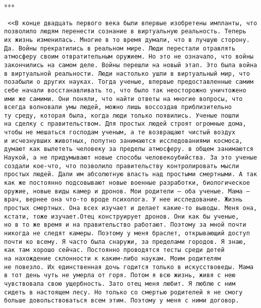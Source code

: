  \begin{center}
 	***
 \end{center}
{\tt
\setlength{\leftskip}{1em}
\setlength{\rightskip}{6em}
<<В~конце двадцать первого века были впервые изобретены импланты, что позволило людям перенести сознание в~виртуальную реальность.
Теперь их~жизнь изменилась.
Многие в~то~время думали, что в~лучшую сторону.
Да.
Войны прекратились в~реальном мире.
Люди перестали отравлять атмосферу своим отвратительным оружием.
Но~это не~означало, что войны закончились на~самом деле.
Войны перешли на~новый этап.
Это была война в~виртуальной реальности.
Люди настолько ушли в~виртуальный мир, что позабыли о~других науках.
Тогда ученые, впервые предоставленные самим себе начали восстанавливать то, что было так неосторожно уничтожено ими же~самими.
Они поняли, что найти ответы на~многие вопросы, что всегда волновали умы людей, можно лишь воссоздав приблизительно ту~среду, которая была, когда люди только появились.
Ученые пошли на~сделку с~правительством.
Для простых людей строят огромные дома, чтобы не~мешаться господам ученым, а~те~возвращают чистый воздух и~исчезнувших животных, попутно занимаются исследованиями космоса, думают как вылететь человеку за~пределы атмосферу.
в~общем занимаются Наукой, а~не~придумывают новые способы человекоубийства.
За~это ученые создали кое-что, что позволило правительству контролировать мысли простых людей.
Дали им~абсолютную власть над простыми смертными.
А~так как же~постоянно подсовывают новые военные разработки, биологическое оружие, новые виды камер и~дронов.
Мои родители -- оба ученые.
Мама -- врач, вернее она что-то вроде психолога.
У~нее исследование.
Жизнь простых смертных.
Она всех изучает и~делает какие-то выводы.
Меня она, кстати, тоже изучает.Отец конструирует дронов.
Они как бы~ученые, но~в~то~же~время и~на~правительство работают.
Поэтому за~мной почти никогда не~следят камеры.
Поэтому у~меня браслет, открывающий доступ почти ко~всему.
Я~часто была снаружи, за~пределами городов.
Я~знаю, как там хорошо сейчас.
Постоянно проводятся тесты среди детей на~нахождение склонности к~каким-либо наукам.
Моим родителям не~повезло.
Их~единственная дочь годится только в~искусствоведы.
Мама в~тот день чуть не~умерла от~горя.
Потом я~всю жизнь, живя с~нею чувствовала свою ущербность.
Зато отец меня любит.
Я~люблю с~ним сидеть в~настоящем лесу.
Но~только со~смертью родителей я~не~смогу больше довольствоваться всем этим.
Поэтому у~меня с~ними договор.

}
